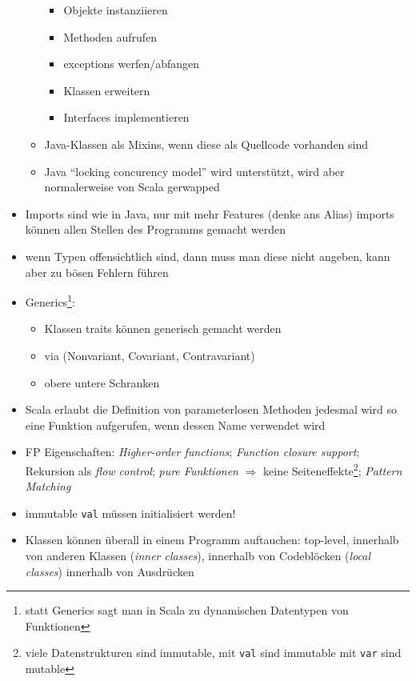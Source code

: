 \begin{itemize}
\begin{itemize}
\begin{itemize}
      \item Objekte instanziieren
      \item Methoden aufrufen
      \item exceptions werfen/abfangen
      \item Klassen erweitern
      \item Interfaces implementieren
    \end{itemize}    
    \item Java-Klassen als Mixins, wenn diese als Quellcode vorhanden
    sind
    \item Java \enquote{locking \und concurency model} wird unterstützt, wird
    aber normalerweise von Scala gerwapped
  \end{itemize}
  \item Imports sind wie in Java, nur mit mehr Features (denke ans
  Alias) \und imports können allen Stellen des Programms gemacht werden
  \item wenn Typen offensichtlich sind, dann muss man diese nicht angeben, kann
  aber zu bösen Fehlern führen
  \item Generics\footnote{statt Generics sagt man in Scala zu 
  dynamischen Datentypen von Funktionen }:
  \begin{itemize}
    \item Klassen \und traits können generisch gemacht werden
    \item via  (Nonvariant, Covariant, Contravariant)
    \item obere \und untere Schranken
  \end{itemize}
  \item Scala erlaubt die Definition von parameterlosen Methoden \und jedesmal
  wird so eine Funktion aufgerufen, wenn dessen Name verwendet wird
  \item FP Eigenschaften: \textit{Higher-order functions}; 
  \textit{Function closure support}; Rekursion als \textit{flow control}; 
  \textit{pure Funktionen} $\Rightarrow$ keine 
  Seiteneffekte\footnote{viele Datenstrukturen sind immutable, mit 
  \texttt{val} sind immutable \und mit \texttt{var} sind mutable};
  \textit{Pattern Matching}
  \item immutable \texttt{val} müssen initialisiert werden!  
  \item Klassen können überall in einem Programm auftauchen: top-level,
  innerhalb von anderen Klassen (\textit{inner classes}), innerhalb von
  Codeblöcken (\textit{local classes}) \und innerhalb von Ausdrücken 

\end{itemize}
